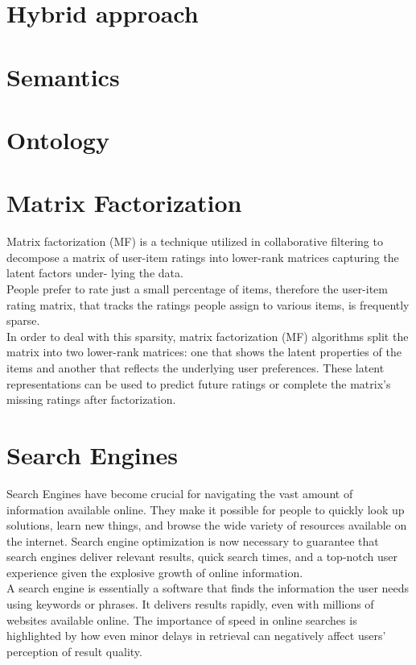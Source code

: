 \documentclass[10pt,oneside,english,a4paper]{article}
\begin{document}
\section{Hybrid approach}

\clearpage
\section{Semantics}

\section{Ontology}

\section{Matrix Factorization}
Matrix factorization (MF) is a technique utilized in collaborative filtering to decompose
a matrix of user-item ratings into lower-rank matrices capturing the latent factors under-
lying the data\cite{Tokala2023}.\\
People prefer to rate just a small percentage of items, therefore the user-item rating matrix, that tracks the ratings people assign to various items, is frequently sparse.\\
In order to deal with this sparsity, matrix factorization (MF) algorithms split the matrix into two lower-rank matrices: one that shows the latent properties of the items and another that reflects the underlying user preferences. These latent representations can be used to predict future ratings or complete the matrix's missing ratings after factorization.

\section{Search Engines}
Search Engines have become crucial for navigating the vast amount of information available online. They make it possible for people to quickly look up solutions, learn new things, and browse the wide variety of resources available on the internet. Search engine optimization is now necessary to guarantee that search engines deliver relevant results, quick search times, and a top-notch user experience given the explosive growth of online information.\\
A search engine is essentially a software that finds the information the user needs using keywords or phrases. It delivers results rapidly, even with millions of websites available online.
The importance of speed in online searches is highlighted by how even minor delays in retrieval can negatively affect users' perception of result quality.
\cite{pub.1171882357}
\end{document}
